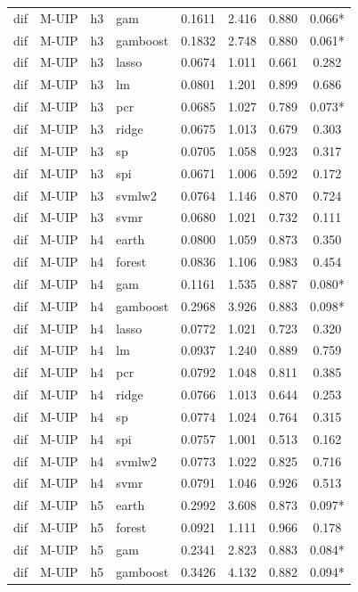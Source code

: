 \begin{ThreePartTable}
\begin{longtable}[t]{llclcccc}
dif & M-UIP & h3 & gam & 0.1611 & 2.416 & 0.880 & 0.066*\\
dif & M-UIP & h3 & gamboost & 0.1832 & 2.748 & 0.880 & 0.061*\\
dif & M-UIP & h3 & lasso & 0.0674 & 1.011 & 0.661 & 0.282\\
dif & M-UIP & h3 & lm & 0.0801 & 1.201 & 0.899 & 0.686\\
dif & M-UIP & h3 & pcr & 0.0685 & 1.027 & 0.789 & 0.073*\\
dif & M-UIP & h3 & ridge & 0.0675 & 1.013 & 0.679 & 0.303\\
dif & M-UIP & h3 & sp & 0.0705 & 1.058 & 0.923 & 0.317\\
dif & M-UIP & h3 & spi & 0.0671 & 1.006 & 0.592 & 0.172\\
dif & M-UIP & h3 & svmlw2 & 0.0764 & 1.146 & 0.870 & 0.724\\
dif & M-UIP & h3 & svmr & 0.0680 & 1.021 & 0.732 & 0.111\\
\addlinespace
dif & M-UIP & h4 & earth & 0.0800 & 1.059 & 0.873 & 0.350\\
dif & M-UIP & h4 & forest & 0.0836 & 1.106 & 0.983 & 0.454\\
dif & M-UIP & h4 & gam & 0.1161 & 1.535 & 0.887 & 0.080*\\
dif & M-UIP & h4 & gamboost & 0.2968 & 3.926 & 0.883 & 0.098*\\
dif & M-UIP & h4 & lasso & 0.0772 & 1.021 & 0.723 & 0.320\\
dif & M-UIP & h4 & lm & 0.0937 & 1.240 & 0.889 & 0.759\\
dif & M-UIP & h4 & pcr & 0.0792 & 1.048 & 0.811 & 0.385\\
dif & M-UIP & h4 & ridge & 0.0766 & 1.013 & 0.644 & 0.253\\
dif & M-UIP & h4 & sp & 0.0774 & 1.024 & 0.764 & 0.315\\
dif & M-UIP & h4 & spi & 0.0757 & 1.001 & 0.513 & 0.162\\
dif & M-UIP & h4 & svmlw2 & 0.0773 & 1.022 & 0.825 & 0.716\\
dif & M-UIP & h4 & svmr & 0.0791 & 1.046 & 0.926 & 0.513\\
\addlinespace
dif & M-UIP & h5 & earth & 0.2992 & 3.608 & 0.873 & 0.097*\\
dif & M-UIP & h5 & forest & 0.0921 & 1.111 & 0.966 & 0.178\\
dif & M-UIP & h5 & gam & 0.2341 & 2.823 & 0.883 & 0.084*\\
dif & M-UIP & h5 & gamboost & 0.3426 & 4.132 & 0.882 & 0.094*\\

\end{longtable}
\end{ThreePartTable}
